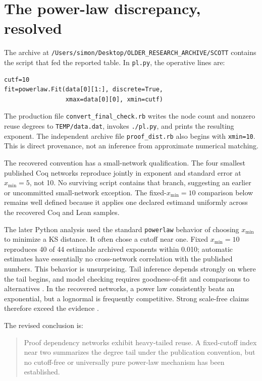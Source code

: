 \documentclass[11pt]{article}
\newcommand{\code}[1]{\texttt{#1}}
\newcommand{\xmin}{x_{\min}}
\begin{document}
\section{The power-law discrepancy, resolved}

The archive at \code{/Users/simon/Desktop/OLDER\_RESEARCH\_ARCHIVE/SCOTT} contains the script that
fed the reported table.  In \code{pl.py}, the operative lines are:
\begin{verbatim}
cutf=10
fit=powerlaw.Fit(data[0][1:], discrete=True,
                 xmax=data[0][0], xmin=cutf)
\end{verbatim}
The production file \code{convert\_final\_check.rb} writes the node count and nonzero reuse degrees
to \code{TEMP/data.dat}, invokes \code{./pl.py}, and prints the resulting exponent.  The independent
archive file \code{proof\_dist.rb} also begins with \code{xmin=10}.  This is direct provenance, not
an inference from approximate numerical matching.

The recovered convention has a small-network qualification.  The four smallest published Coq
networks reproduce jointly in exponent and standard error at $\xmin=5$, not 10.  No surviving
script contains that branch, suggesting an earlier or uncommitted small-network exception.  The
fixed-$\xmin=10$ comparison below remains well defined because it applies one declared estimand
uniformly across the recovered Coq and Lean samples.

The later Python analysis used the standard \code{powerlaw} behavior of choosing $\xmin$ to minimize
a KS distance.  It often chose a cutoff near one.  Fixed $\xmin=10$ reproduces 40 of 44 estimable
archived exponents within 0.010; automatic estimates have essentially no cross-network correlation with the
published numbers.  This behavior is unsurprising.  Tail inference depends strongly on where the
tail begins, and model checking requires goodness-of-fit and comparisons to alternatives
\citep{clauset2009,alstott2014}.  In the recovered networks, a power law consistently beats an
exponential, but a lognormal is frequently competitive.  Strong scale-free claims therefore exceed
the evidence \citep{broido2019}.

The revised conclusion is:
\begin{quote}
Proof dependency networks exhibit heavy-tailed reuse.  A fixed-cutoff index near two summarizes
the degree tail under the publication convention, but no cutoff-free or universally pure power-law
mechanism has been established.
\end{quote}
\end{document}
